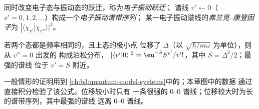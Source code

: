 \begin{definition}\label{def:b3:electronic-spectroscopy:vibronic}
同时改变电子态与振动态的跃迁，称为\emph{电子振动跃迁}；
谱线 $v' \leftarrow 0$（$v' = 0, 1, 2,
\dots$）构成一个\emph{电子振动谱带序列}；
某一电子振动谱线的\emph{弗兰克–康登因子}为
$|\langle\chi_{v'}|\chi_{v''}\rangle|^2$。
\end{definition}

\begin{proposition}[位移振子]\label{prop:b3:electronic-spectroscopy:displaced}
若两个态都是频率相同的，且上态的极小点
位移了 $\Delta$（以 $\sqrt{\hbar/m\omega}$ 为单位），则从 $v'' = 0$ 出发的
构成泊松分布，
$|\langle v'|0\rangle|^2 = \eu^{-S}S^{v'}/v'!$，其中 $S = \Delta^2/2$；最强的谱线
位于 $v' = S$ 附近。
\end{proposition}
\admitted

一般情形的证明用到
\cref{ch:b3:quantum-model-systems}中的；本章图中的数据
通过直接积分检验了该公式。位移较小时只有
一条很强的 0--0 谱线；位移较大时为长的谱带序列，其中最强的谱线
远离 0--0 谱线。

